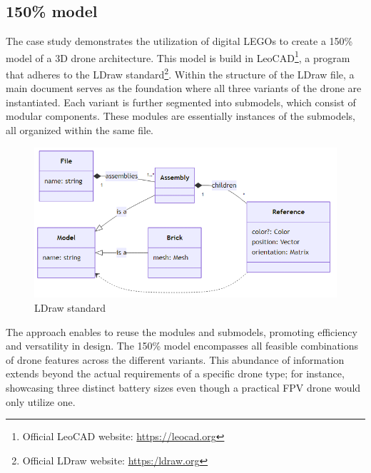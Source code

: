 \documentclass[sigconf,review]{acmart}
\begin{document}
\subsection{150\% model}
\label{sec:150-model}

The case study demonstrates the utilization of digital LEGOs to create a 150\% model of a 3D drone architecture. 
This model is build in LeoCAD\footnote{Official LeoCAD website: \url{https://leocad.org}}, a program that adheres to the LDraw standard\footnote{Official LDraw website: \url{https:/ldraw.org}}. 
Within the structure of the LDraw file, a main document serves as the foundation where all three variants of the drone are instantiated. 
Each variant is further segmented into submodels, which consist of modular components. 
These modules are essentially instances of the submodels, all organized within the same file.

\begin{figure}[htbp]
    \includegraphics[width=\columnwidth]{./ldraw-standard.png}
    \caption{LDraw standard}
    \label{fig:ldraw-standard}
\end{figure}

The approach enables to reuse the modules and submodels, promoting efficiency and versatility in design. 
The 150\% model encompasses all feasible combinations of drone features across the different variants. 
This abundance of information extends beyond the actual requirements of a specific drone type; for instance, showcasing three distinct battery sizes even though a practical FPV drone would only utilize one.
\end{document}
